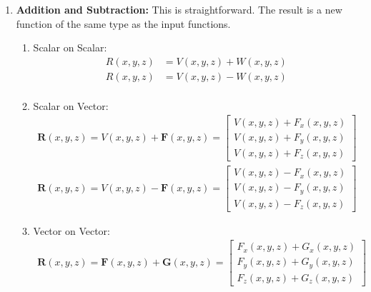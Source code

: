 \begin{enumerate}
  \item \textbf{Addition and Subtraction:} This is straightforward. The
    result is a new function of the same type as the input functions.
    \begin{enumerate}
      \item Scalar on Scalar:
        \begin{align*}
          R(x, y, z) &= V(x, y, z) + W(x, y, z) \\
          R(x, y, z) &= V(x, y, z) - W(x, y, z) \\
        \end{align*}
      \item Scalar on Vector:
        \begin{align*}
          \mathbf{R}(x, y, z) = V(x, y, z) + \mathbf{F}(x, y, z)
                              = \begin{bmatrix}
                                  V(x, y, z) + F_x(x, y, z) \\
                                  V(x, y, z) + F_y(x, y, z) \\
                                  V(x, y, z) + F_z(x, y, z)
                                \end{bmatrix} \\
          \mathbf{R}(x, y, z) = V(x, y, z) - \mathbf{F}(x, y, z)
                              = \begin{bmatrix}
                                  V(x, y, z) - F_x(x, y, z) \\
                                  V(x, y, z) - F_y(x, y, z) \\
                                  V(x, y, z) - F_z(x, y, z)
                                \end{bmatrix}
        \end{align*}
      \item Vector on Vector:
        \begin{align*}
          \mathbf{R}(x, y, z) = \mathbf{F}(x, y, z) + \mathbf{G}(x, y, z)
                              = \begin{bmatrix}
                                  F_x(x, y, z) + G_x(x, y, z) \\
                                  F_y(x, y, z) + G_y(x, y, z) \\
                                  F_z(x, y, z) + G_z(x, y, z)
                                \end{bmatrix} \\

\end{align*}
\end{enumerate}
\end{enumerate}
